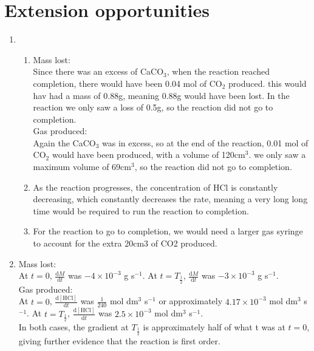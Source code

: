 \documentclass{article}
\begin{document}
\section{Extension opportunities}
\begin{enumerate}
\item \begin{enumerate}
\item Mass lost:\\Since there was an excess of CaCO$_3$, when the reaction reached completion, there would have been 0.04 mol of CO$_2$ produced. this would hav had a mass of 0.88g, meaning 0.88g would have been lost. In the reaction we only saw a loss of 0.5g, so the reaction did not go to completion.\\ Gas produced:\\Again the CaCO$_3$ was in excess, so at the end of the reaction, 0.01 mol of CO$_2$ would have been produced, with a volume of 120cm$^3$. we only saw a maximum volume of 69cm$^3$, so the reaction did not go to completion. 

\item As the reaction progresses, the concentration of HCl is constantly decreasing, which constantly decreases the rate, meaning a very long long time would be required to run the reaction to completion. 

\item For the reaction to go to completion, we would need a larger gas syringe to account for the extra 20cm3 of CO2 produced. 

\end{enumerate}

\item Mass lost:\\At $t=0$, $\frac{\mathrm{d}M}{\mathrm{d}t}$ was $-4\times10^{-3}$ g s$^{-1}$. At $t=T_\frac12$, $\frac{\mathrm{d}M}{\mathrm{d}t}$ was $-3\times10^{-3}$ g s$^{-1}$.\\ Gas produced:\\At $t=0$, $\frac{\mathrm{d}[\text{HCl}]}{\mathrm{d}t}$ was $\frac1{240}$ mol dm$^3$ s$^{-1}$ or approximately $4.17\times10^{-3}$ mol dm$^3$ s$^{-1}$. At $t=T_\frac12$, $\frac{\mathrm{d}[\text{HCl}]}{\mathrm{d}t}$ was $2.5\times10^{-3}$ mol dm$^3$ s$^{-1}$.\\ In both cases, the gradient at $T_\frac12$ is approximately half of what t was at $t=0$, giving further evidence that the reaction is first order. 

\end{enumerate}
\end{document}
